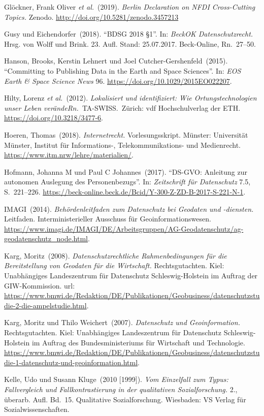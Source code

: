 \documentclass[a4paper,
fontsize=11pt,
oneside,
numbers=noperiodatend,
parskip=half-,
bibliography=totoc,
final
]{scrartcl}
\begin{document}
Glöckner, Frank Oliver \emph{et al.}~(2019). \emph{Berlin Declaration on
NFDI Cross-Cutting Topics.} Zenodo.
\url{http://doi.org/10.5281/zenodo.3457213}

Gusy und Eichendorfer~(2018). \enquote{BDSG 2018 §1}. In: \emph{BeckOK
Datenschutzrecht.} Hrsg. von Wolff und Brink. 23. Aufl. Stand:
25.07.2017. Beck-Online, Rn.~27--50.

Hanson, Brooks, Kerstin Lehnert und Joel Cutcher-Gershenfeld~(2015).
\enquote{Committing to Publishing Data in the Earth and Space Sciences}.
In: \emph{EOS Earth \& Space Science News} 96.
\url{https://doi.org/10.1029/2015EO022207}.

Hilty, Lorenz \emph{et al.}~(2012). \emph{Lokalisiert und identifiziert:
Wie Ortungstechnologien unser Leben verändeRn.~}TA-SWISS.~Zürich: vdf
Hochschulverlag der ETH. \url{https://doi.org/10.3218/3477-6}.

Hoeren, Thomas~(2018). \emph{Internetrecht.} Vorlesungsskript. Münster:
Universität Münster, Institut für Informations-, Telekommunikations- und
Medienrecht. \url{https://www.itm.nrw/lehre/materialien/}.

Hofmann, Johanna M und Paul C Johannes~(2017). \enquote{DS-GVO:
Anleitung zur autonomen Auslegung des Personenbezugs}. In:
\emph{Zeitschrift für Datenschutz} 7.5, S.~221--226.
\url{https://beck-online.beck.de/Bcid/Y-300-Z-ZD-B-2017-S-221-N-1}.

IMAGI~(2014). \emph{Behördenleitfaden zum Datenschutz bei Geodaten und
-diensten.} Leitfaden. Interministerieller Ausschuss für
Geoinformationswesen.
\url{https://www.imagi.de/IMAGI/DE/Arbeitsgruppen/AG-Geodatenschutz/ag-geodatenschutz_node.html}.

Karg, Moritz~(2008). \emph{Datenschutzrechtliche Rahmenbedingungen für
die Bereitstellung von Geodaten für die Wirtschaft.} Rechtsgutachten.
Kiel: Unabhängiges Landeszentrum für Datenschutz Schleswig-Holstein im
Auftrag der GIW-Kommission. url:
\url{https://www.bmwi.de/Redaktion/DE/Publikationen/Geobusiness/datenschutzstudie-2-die-ampelstudie.html}.

Karg, Moritz und Thilo Weichert~(2007). \emph{Datenschutz und
Geoinformation.} Rechtsgutachten. Kiel: Unabhängiges Landeszentrum für
Datenschutz Schleswig-Holstein im Auftrag des Bundesministeriums für
Wirtschaft und Technologie.
\url{https://www.bmwi.de/Redaktion/DE/Publikationen/Geobusiness/datenschutzstudie-1-datenschutz-und-geoinformation.html}.

Kelle, Udo und Susann Kluge~(2010 {[}1999{]}). \emph{Vom Einzelfall zum
Typus: Fallvergleich und Fallkontrastierung in der qualitativen
Sozialforschung.} 2., überarb. Aufl. Bd.~15. Qualitative
Sozialforschung. Wiesbaden: VS Verlag für Sozialwissenschaften.
\end{document}
